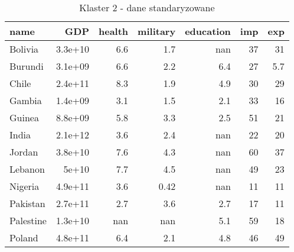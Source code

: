 \begin{table}
    \centering
    \caption{Klaster 2 - dane standaryzowane}
    \label{tab:cl2std}
    \begin{tabular}{lrrrrrr}
        \toprule
        name      & GDP     & health & military & education & imp & exp \\
        \midrule
        Bolivia   & 3.3e+10 & 6.6    & 1.7      & nan       & 37  & 31  \\
        Burundi   & 3.1e+09 & 6.6    & 2.2      & 6.4       & 27  & 5.7 \\
        Chile     & 2.4e+11 & 8.3    & 1.9      & 4.9       & 30  & 29  \\
        Gambia    & 1.4e+09 & 3.1    & 1.5      & 2.1       & 33  & 16  \\
        Guinea    & 8.8e+09 & 5.8    & 3.3      & 2.5       & 51  & 21  \\
        India     & 2.1e+12 & 3.6    & 2.4      & nan       & 22  & 20  \\
        Jordan    & 3.8e+10 & 7.6    & 4.3      & nan       & 60  & 37  \\
        Lebanon   & 5e+10   & 7.7    & 4.5      & nan       & 49  & 23  \\
        Nigeria   & 4.9e+11 & 3.6    & 0.42     & nan       & 11  & 11  \\
        Pakistan  & 2.7e+11 & 2.7    & 3.6      & 2.7       & 17  & 11  \\
        Palestine & 1.3e+10 & nan    & nan      & 5.1       & 59  & 18  \\
        Poland    & 4.8e+11 & 6.4    & 2.1      & 4.8       & 46  & 49  \\
        \bottomrule
    \end{tabular}
\end{table}
